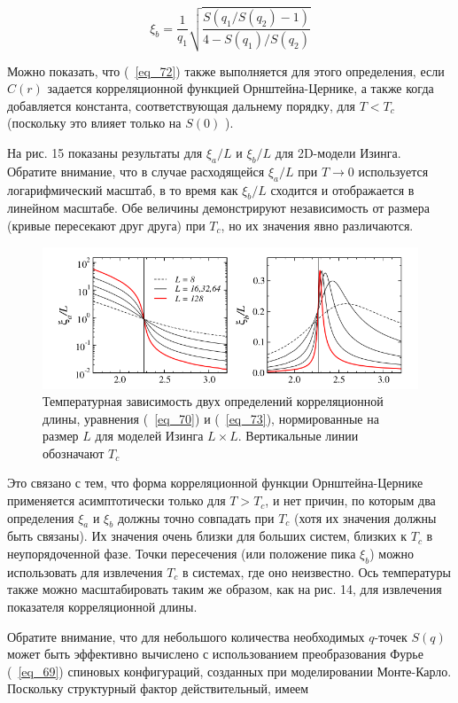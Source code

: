\documentclass[11pt]{article}
\begin{document}
\begin{equation}
\xi_b=\frac{1}{q_1} \sqrt{\frac{S(q_1/S(q_2)-1)}{4-S(q_1)/S(q_2)}}
\label{eq_73}
\end{equation}

Можно показать, что (~\ref{eq_72}) также выполняется для этого определения, если $C(r)$ задается корреляционной функцией Орнштейна-Цернике, а также когда добавляется константа, соответствующая дальнему порядку, для $T <T_c$ (поскольку это влияет только на $S(0)$ ).

На рис. 15 показаны результаты для $\xi_a/L$ и $\xi_b/L$ для 2D-модели Изинга. Обратите внимание, что в случае расходящейся $\xi_a/L$ при $T → 0$ используется логарифмический масштаб, в то время как $\xi_b/L$ сходится и отображается в линейном масштабе. Обе величины демонстрируют независимость от размера (кривые пересекают друг друга) при $T_c$, но их значения явно различаются. 

\begin{figure}[htp]
\centering
\includegraphics[scale=0.5]{fig15}
\caption{Температурная зависимость двух определений корреляционной длины, уравнения (~\ref{eq_70}) и (~\ref{eq_73}), нормированные на размер $L$ для моделей Изинга $L × L$. Вертикальные линии обозначают $T_c$}
\label{}
\end{figure}

Это связано с тем, что форма корреляционной функции Орнштейна-Цернике применяется асимптотически только для $T> T_c$, и нет причин, по которым два определения $\xi_a$ и $\xi_b$ должны точно совпадать при $T_c$ (хотя их значения должны быть связаны). Их значения очень близки для больших систем, близких к $T_c$ в неупорядоченной фазе. Точки пересечения (или положение пика $\xi_b$) можно использовать для извлечения $T_c$ в системах, где оно неизвестно. Ось температуры также можно масштабировать таким же образом, как на рис. 14, для извлечения показателя корреляционной длины.

Обратите внимание, что для небольшого количества необходимых $q$-точек $S(q)$ может быть эффективно вычислено с использованием преобразования Фурье (~\ref{eq_69}) спиновых конфигураций, созданных при моделировании Монте-Карло. Поскольку структурный фактор действительный, имеем
\end{document}
